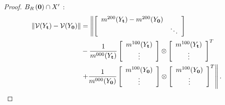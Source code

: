 \begin{proof}
  $B_{R}\left(\mathbf{0}\right) \cap X'$ :
  \begin{align}
   \| \mathcal{V}( Y_{\mathbf{t}} ) - \mathcal{V}(Y_{\mathbf{0}})\|
   &= \left\| \left\lbrack \begin{array}{cc}
       m^{200}(Y_{\mathbf{t}}) - m^{200}(Y_{\mathbf{0}}) & \\
       & \ddots
     \end{array} \right\rbrack
   \right. \nonumber\\
  & - \frac{1}{m^{000}(Y_{\mathbf{t}})}
   \left\lbrack \begin{array}{c}
     m^{100}(Y_{\mathbf{t}}) \\
     \vdots
   \end{array} \right\rbrack
   \otimes
   \left\lbrack \begin{array}{c}
     m^{100}(Y_{\mathbf{t}}) \\
     \vdots
   \end{array} \right\rbrack^T
   \nonumber\\
  & \left.
   + \frac{1}{m^{000}(Y_{\mathbf{0}})}
   \left\lbrack \begin{array}{c}
     m^{100}(Y_{\mathbf{0}}) \\
     \vdots
   \end{array} \right\rbrack
   \otimes
   \left\lbrack \begin{array}{c}
     m^{100}(Y_{\mathbf{0}}) \\
     \vdots
   \end{array} \right\rbrack^T
   \right\|.
  \end{align}


\end{proof}
